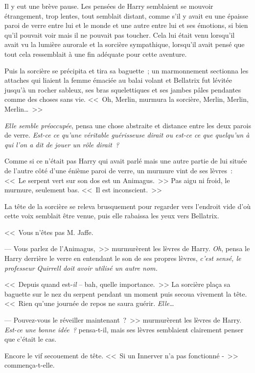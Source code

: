 Il y eut une brève pause. Les pensées de Harry semblaient se mouvoir étrangement, trop lentes, tout semblait distant, comme s'il y avait eu une épaisse paroi de verre entre lui et le monde et une autre entre lui et ses émotions, si bien qu'il pouvait voir mais il ne pouvait pas toucher. Cela lui était venu lorsqu'il avait vu la lumière aurorale et la sorcière sympathique, lorsqu'il avait pensé que tout cela ressemblait à une fin adéquate pour cette aventure.

Puis la sorcière se précipita et tira sa baguette~; un marmonnement sectionna les attaches qui liaient la femme émaciée au balai volant et Bellatrix fut lévitée jusqu'à un rocher sableux, ses bras squelettiques et ses jambes pâles pendantes comme des choses sans vie. <<~Oh, Merlin, murmura la sorcière, Merlin, Merlin, Merlin…~>>

\emph{Elle semble préoccupée}, pensa une chose abstraite et distance entre les deux parois de verre. \emph{Est-ce ce qu'une véritable guérisseuse dirait ou est-ce ce que quelqu'un à qui l'on a dit de jouer un rôle dirait~?}

Comme si ce n'était pas Harry qui avait parlé mais une autre partie de lui située de l'autre côté d'une énième paroi de verre, un murmure vint de ses lèvres~: <<~Le serpent vert sur son dos est un Animagus.~>> Pas aigu ni froid, le murmure, seulement bas. <<~Il est inconscient.~>>

La tête de la sorcière se releva brusquement pour regarder vers l'endroit vide d'où cette voix semblait être venue, puis elle rabaissa les yeux vers Bellatrix.

<<~Vous n'êtes pas M. Jaffe.

--- Vous parlez de l'Animagus,~>> murmurèrent les lèvres de Harry. \emph{Oh}, pensa le Harry derrière le verre en entendant le son de ses propres lèvres, \emph{c'est sensé, le professeur Quirrell doit avoir utilisé un autre nom.}

<<~Depuis quand est-\emph{il} -- bah, quelle importance.~>> La sorcière plaça sa baguette sur le nez du serpent pendant un moment puis secoua vivement la tête. <<~Rien qu'une journée de repos ne saura guérir. \emph{Elle…}

--- Pouvez-vous le réveiller maintenant~?~>> murmurèrent les lèvres de Harry. \emph{Est-ce une bonne idée~?} pensa-t-il, mais ses lèvres semblaient clairement penser que c'était le cas.

Encore le vif secouement de tête. <<~Si un Innerver n'a pas fonctionné -~>> commença-t-elle.

